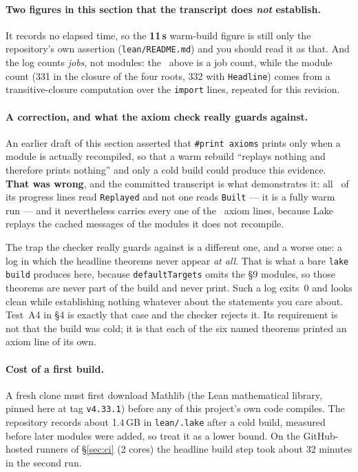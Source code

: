 \documentclass[11pt]{article}
\newcommand{\code}[1]{\texttt{\small #1}}
\begin{document}
\paragraph{Two figures in this section that the transcript does \emph{not}
establish.} It records no elapsed time, so the \textbf{11\,s} warm-build figure
is still only the repository's own assertion (\code{lean/README.md}) and you
should read it as that. And the log counts \emph{jobs}, not modules: the
\hljobs\ above is a job count, while the module count (331 in the closure of
the four roots, 332 with \code{Headline}) comes from a transitive-closure
computation over the \code{import} lines, repeated for this revision.

\paragraph{A correction, and what the axiom check really guards against.}
An earlier draft of this section asserted that \code{\#print axioms} prints
only when a module is actually recompiled, so that a warm rebuild ``replays
nothing and therefore prints nothing'' and only a cold build could produce this
evidence. \textbf{That was wrong}, and the committed transcript is what
demonstrates it: all \hlreplayed\ of its progress lines read \code{Replayed}
and not one reads \code{Built} --- it is a fully warm run --- and it
nevertheless carries every one of the \hldepends\ axiom lines, because Lake
replays the cached messages of the modules it does not recompile.

The trap the checker really guards against is a different one, and a worse one:
a log in which the headline theorems never appear \emph{at all}. That is what a
bare \code{lake build} produces here, because \code{defaultTargets} omits the
\S9 modules, so those theorems are never part of the build and never print.
Such a log exits~0 and looks clean while establishing nothing whatever about
the statements you care about. Test~A4 in \S4 is exactly that case and the
checker rejects it. Its requirement is not that the build was cold; it is that
each of the six named theorems printed an axiom line of its own.

\paragraph{Cost of a first build.} A fresh clone must first download
Mathlib (the Lean mathematical library, pinned here at tag \code{v4.33.1})
before any of this project's own code compiles. The repository records about
1.4\,GB in \code{lean/.lake} after a cold build, measured before later modules
were added, so treat it as a lower bound. On the GitHub-hosted runners of
\S\ref{sec:ci} (2 cores) the headline build step took about 32 minutes in the
second run.
\end{document}
